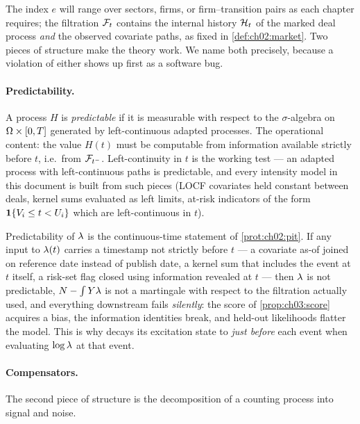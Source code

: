 The index $e$ will range over sectors, firms, or firm--transition pairs as
each chapter requires; the filtration $\mathcal{F}_{t}$ contains the internal history
$\mathcal{H}_t$ of the marked deal process \emph{and} the observed covariate
paths, as fixed in \cref{def:ch02:market}. Two pieces of structure make the
theory work. We name both precisely, because a violation of either shows up
first as a software bug.

\paragraph{Predictability.}
A process $H$ is \emph{predictable} if it is measurable with respect to the
$\sigma$-algebra on $\Omega \times [0,T]$ generated by left-continuous
adapted processes. The operational content: the value $H(t)$ must be
computable from information available strictly before $t$, i.e.\ from
$\mathcal{F}_{t^-}$. Left-continuity in $t$ is the working test --- an adapted process
with left-continuous paths is predictable, and every intensity model in
this document is built from such pieces (LOCF covariates held constant
between deals, kernel sums evaluated as left limits, at-risk indicators of
the form $\mathbf{1}\{V_i \le t < U_i\}$ which are left-continuous in $t$).

\begin{warning}\label{warn:ch03:lookahead}
Predictability of $\lambda$ is the continuous-time statement of
\cref{prot:ch02:pit}. If any input to $\lambda(t)$ carries a timestamp not
strictly before $t$ --- a covariate as-of joined on reference date instead
of publish date, a kernel sum that includes the event at $t$ itself, a
risk-set flag closed using information revealed at $t$ --- then $\lambda$ is
not predictable, $N - \int Y\lambda$ is not a martingale with respect to
the filtration actually used, and everything downstream fails
\emph{silently}: the score of \cref{prop:ch03:score} acquires a bias, the
information identities break, and held-out likelihoods flatter the model.
This is why  decays its excitation state
to \emph{just before} each event when evaluating $\log\lambda$ at that event.
\end{warning}

\paragraph{Compensators.}
The second piece of structure is the decomposition of a counting process
into signal and noise.

